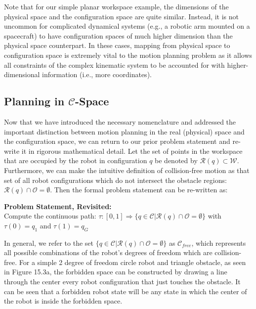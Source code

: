 \documentclass[twoside]{article}
\begin{document}
Note that for our simple planar workspace example, the dimensions of the physical space and the configuration space are quite similar. Instead, it is not uncommon for complicated dynamical systems (e.g., a robotic arm mounted on a spacecraft) to have configuration spaces of much higher dimension than the physical space counterpart. In these cases, mapping from physical space to configuration space is extremely vital to the motion planning problem as it allows all constraints of the complex kinematic system to be accounted for with higher-dimensional information (i.e., more coordinates).

\subsection{ Planning in $\mathcal{C}$-Space }
Now that we have introduced the necessary nomenclature and addressed the important distinction between motion planning in the real (physical) space and the configuration space, we can return to our prior problem statement and re-write it in rigorous mathematical detail. Let the set of points in the workspace that are occupied by the robot in configuration $q$ be denoted by $\mathcal{R}(q) \subset \mathcal{W}$. Furthermore, we can make the intuitive definition of collision-free motion as that set of all robot configurations which do not intersect the obstacle regions: $\mathcal{R}(q)\cap \mathcal{O} = \emptyset$. Then the formal problem statement can be re-written as: 

\textbf{Problem Statement, Revisited:} \\
Compute the continuous path: $\tau : [0, 1]  \Rightarrow \{q \in \mathcal{C}|\mathcal{R}(q) \cap \mathcal{O} = \emptyset\}$ with $\tau(0) = q_1$ and $\tau(1) = q_G$

 In general, we refer to the set $\{q \in \mathcal{C} | \mathcal{R}(q) \cap \mathcal{O} = \emptyset\}$ as $\mathcal{C}_{free}$, which represents all possible combinations of the robot’s degrees of freedom which are collision-free. For a simple 2 degree of freedom circle robot and triangle obstacle, as seen in Figure 15.3a, the forbidden space can be constructed by drawing a line through the center every robot configuration that just touches the obstacle. It can be seen that a forbidden robot state will be any state in which the center of the robot is inside the forbidden space. 
 
\end{document}

